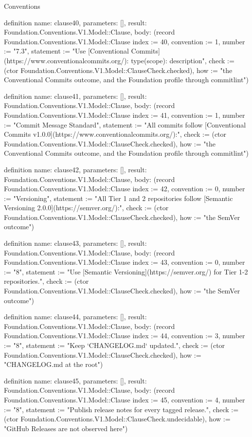 \begin{lexlean}{Conventions}
\begin{semanticmodule}
definition{
  name: clause40,
  parameters: [],
  result: Foundation.Conventions.V1.Model::Clause,
  body: (record Foundation.Conventions.V1.Model::Clause {index := 40, convention := 1, number := "7.3", statement := "Use [Conventional Commits](https://www.conventionalcommits.org/): type(scope): description", check := (ctor Foundation.Conventions.V1.Model::ClauseCheck.checked), how := "the Conventional Commits outcome, and the Foundation profile through commitlint"})
}

definition{
  name: clause41,
  parameters: [],
  result: Foundation.Conventions.V1.Model::Clause,
  body: (record Foundation.Conventions.V1.Model::Clause {index := 41, convention := 1, number := "Commit Message Standard", statement := "All commits follow [Conventional Commits v1.0.0](https://www.conventionalcommits.org/):", check := (ctor Foundation.Conventions.V1.Model::ClauseCheck.checked), how := "the Conventional Commits outcome, and the Foundation profile through commitlint"})
}

definition{
  name: clause42,
  parameters: [],
  result: Foundation.Conventions.V1.Model::Clause,
  body: (record Foundation.Conventions.V1.Model::Clause {index := 42, convention := 0, number := "Versioning", statement := "All Tier 1 and 2 repositories follow [Semantic Versioning 2.0.0](https://semver.org/):", check := (ctor Foundation.Conventions.V1.Model::ClauseCheck.checked), how := "the SemVer outcome"})
}

definition{
  name: clause43,
  parameters: [],
  result: Foundation.Conventions.V1.Model::Clause,
  body: (record Foundation.Conventions.V1.Model::Clause {index := 43, convention := 0, number := "8", statement := "Use [Semantic Versioning](https://semver.org/) for Tier 1-2 repositories.", check := (ctor Foundation.Conventions.V1.Model::ClauseCheck.checked), how := "the SemVer outcome"})
}

definition{
  name: clause44,
  parameters: [],
  result: Foundation.Conventions.V1.Model::Clause,
  body: (record Foundation.Conventions.V1.Model::Clause {index := 44, convention := 3, number := "8", statement := "Keep `CHANGELOG.md` updated.", check := (ctor Foundation.Conventions.V1.Model::ClauseCheck.checked), how := "CHANGELOG.md at the root"})
}

definition{
  name: clause45,
  parameters: [],
  result: Foundation.Conventions.V1.Model::Clause,
  body: (record Foundation.Conventions.V1.Model::Clause {index := 45, convention := 4, number := "8", statement := "Publish release notes for every tagged release.", check := (ctor Foundation.Conventions.V1.Model::ClauseCheck.undecidable), how := "GitHub Releases are not observed here"})
}


\end{semanticmodule}
\end{lexlean}
